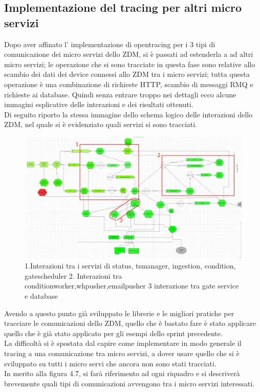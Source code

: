 \documentclass[a4paper,12pt,titlepage,italian,openany]{report}
\begin{document}
\subsection{Implementazione del tracing per altri micro servizi}
Dopo aver affinato l' implementazione di  opentracing per i 3 tipi di comunicazione dei micro servizi dello ZDM\cite{zdm:1}, si è passati ad estenderla a ad altri micro servizi;
le operazione che si sono tracciate in questa fase sono relative allo scambio dei dati dei device connessi allo ZDM\cite{zdm:1} tra i micro servizi; tutta questa operazione è una combinazione di richieste HTTP, scambio di messaggi RMQ e richieste ai database. Quindi senza entrare troppo nei dettagli ecco alcune immagini esplicative delle interazioni e dei risultati ottenuti.\\
Di seguito riporto la stessa immagine dello schema logico delle interazioni dello ZDM\cite{zdm:1}, nel quale si è evidenziato quali servizi si sono tracciati.
\begin{figure}[H]
    \includegraphics[scale=0.3]{61.jpg}
    \centering
    \caption{1.Interazioni tra i servizi di status, tsmanager, ingestion, condition, gatescheduler 2. Interazioni tra conditionworker,whpusher,emailpusher 3 interazione tra gate service e database}
\end{figure}

Avendo a questo punto già sviluppato le librerie e le migliori pratiche per tracciare le comunicazioni dello ZDM\cite{zdm:1}, quello che è bastato fare è stato applicare quello che è già stato applicato per gli esempi dello sprint precedente.
\\ La difficoltà si è spostata dal capire come implementare in modo generale il tracing a una comunicazione tra micro servizi, a dover usare quello che si è sviluppato su tutti i micro servi che ancora non sono stati tracciati.\\
In merito alla figura 4.7, si farà riferimento ad ogni riquadro e si descriverà brevemente quali tipi di comunicazioni avvengono tra i micro servizi interessati.
\end{document}
